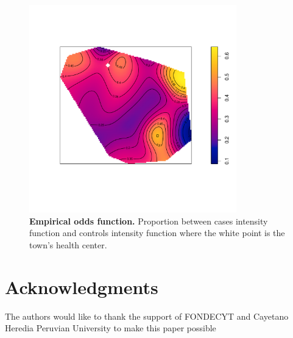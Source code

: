 \documentclass[10pt,letterpaper]{article}
\begin{document}
\begin{figure}[h]
\centering
\includegraphics[width=9cm]{images/case-control.pdf}
\caption{{\bf Empirical odds function.} Proportion between cases intensity function and controls intensity function where the white point is the town's health center.}
\label{casecontrol}
\end{figure}







\section*{Acknowledgments}
The authors would like to thank the support of FONDECYT and Cayetano Heredia Peruvian University to make this paper possible


\newpage


\end{document}
